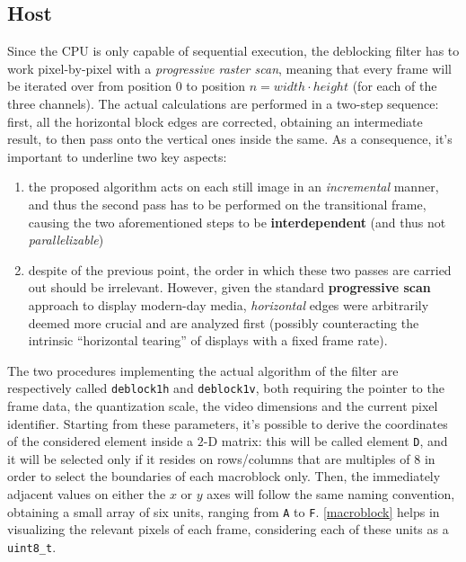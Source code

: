 \documentclass{article}
\begin{document}
\subsection{Host}
Since the CPU is only capable of sequential execution, the deblocking filter has to work pixel-by-pixel with a \textit{progressive raster scan}, meaning that every frame will be iterated over from position $0$ to position $n=width\cdot height$ (for each of the three channels). The actual calculations are performed in a two-step sequence: first, all the horizontal block edges are corrected, obtaining an intermediate result, to then pass onto the vertical ones inside the same. As a consequence, it's important to underline two key aspects:
\begin{enumerate}
    \item the proposed algorithm acts on each still image in an \textit{incremental} manner, and thus the second pass has to be performed on the transitional frame, causing the two aforementioned steps to be \textbf{interdependent} (and thus not \textit{parallelizable})
    \item despite of the previous point, the order in which these two passes are carried out should be irrelevant. However, given the standard \textbf{progressive scan} approach to display modern-day media, \textit{horizontal} edges were arbitrarily deemed more crucial and are analyzed first (possibly counteracting the intrinsic ``horizontal tearing'' of displays with a fixed frame rate).
\end{enumerate}

The two procedures implementing the actual algorithm of the filter are respectively called \texttt{deblock1h} and \texttt{deblock1v}, both requiring the pointer to the frame data, the quantization scale, the video dimensions and the current pixel identifier. Starting from these parameters, it's possible to derive the coordinates of the considered element inside a $2$-D matrix: this will be called element \texttt{D}, and it will be selected only if it resides on rows/columns that are multiples of $8$ in order to select the boundaries of each macroblock only. Then, the immediately adjacent values on either the $x$ or $y$ axes will follow the same naming convention, obtaining a small array of six units, ranging from \texttt{A} to \texttt{F}. \autoref{macroblock} helps in visualizing the relevant pixels of each frame, considering each of these units as a \texttt{uint8\_t}.
\end{document}
